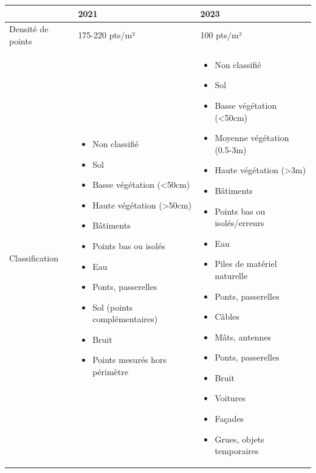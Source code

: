 \begin{table}[H]
    \centering
    \begin{tabular}{|p{2.5cm}|p{5.25cm}|p{5.25cm}|}
    \cline{2-3}
    \multicolumn{1}{c|}{} & \textbf{2021} & \textbf{2023} \\
    \hline
    Densité de points & 175-220 pts/m² & 100 pts/m² \\
    \hline
    Classification & \begin{itemize}[leftmargin=*, topsep=0pt, itemsep=0pt, parsep=0pt]
        \item Non classifié
        \item Sol
        \item Basse végétation (<50cm)
        \item Haute végétation (>50cm)
        \item Bâtiments
        \item Points bas ou isolés
        \item Eau
        \item Ponts, passerelles
        \item Sol (points complémentaires)
        \item Bruit
        \item Points mesurés hors périmètre
    \end{itemize} & \begin{itemize}[leftmargin=*, topsep=0pt, itemsep=0pt, parsep=0pt]
        \item Non classifié
        \item Sol
        \item Basse végétation (<50cm)
        \item Moyenne végétation (0.5-3m)
        \item Haute végétation (>3m)
        \item Bâtiments
        \item Points bas ou isolés/erreurs
        \item Eau
        \item Piles de matériel naturelle
        \item Ponts, passerelles
        \item Câbles
        \item Mâts, antennes
        \item Ponts, passerelles
        \item Bruit
        \item Voitures
        \item Façades
        \item Grues, objets temporaires

\end{itemize}
\end{tabular}
\end{table}
